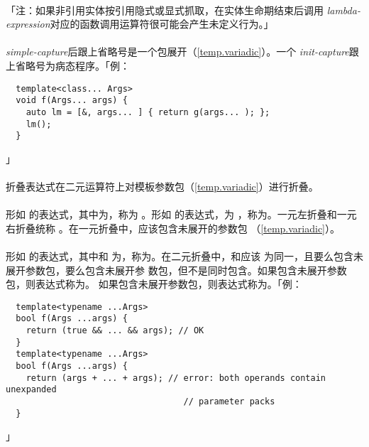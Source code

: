 \paragraph{}
「注：如果非引用实体按引用隐式或显式抓取，在实体生命期结束后调用
\textit{lambda-expression}对应的函数调用运算符很可能会产生未定义行为。」

\paragraph{}
\textit{simple-capture}后跟上省略号是一个包展开（\ref{temp.variadic}）。一个
\textit{init-capture}跟上省略号为病态程序。「例：
\begin{lstlisting}
  template<class... Args>
  void f(Args... args) {
    auto lm = [&, args... ] { return g(args... ); };
    lm();
  }
\end{lstlisting}」


\paragraph{}
折叠表达式在二元运算符上对模板参数包（\ref{temp.variadic}）进行折叠。

  \synprd{\tm{+\ \ -\ \ *\ \ /\ \ \%\ \ \^\ \ \&\ \ |\ \ \tl{}\tl\ \ \tg{}\tg}}
  \synprd{\tm{+= -= *= /= \%= \^{}= \&= |= \tl{}\tl= \tg{}\tg= =}}

\paragraph{}
形如 的表达式，其中为，称为
。形如 的表达式，为
，称为。一元左折叠和一元右折叠统称
。在一元折叠中，应该包含未展开的参数包
（\ref{temp.variadic}）。

\paragraph{}
形如    的表达式，其中和
为，称为。在二元折叠中，和应该
为同一，且要么包含未展开参数包，要么包含未展开参
数包，但不是同时包含。如果包含未展开参数包，则表达式称为。
如果包含未展开参数包，则表达式称为。「例：
\begin{lstlisting}
  template<typename ...Args>
  bool f(Args ...args) {
    return (true && ... && args); // OK
  }
  template<typename ...Args>
  bool f(Args ...args) {
    return (args + ... + args); // error: both operands contain unexpanded
                                   // parameter packs
  }
\end{lstlisting}」

